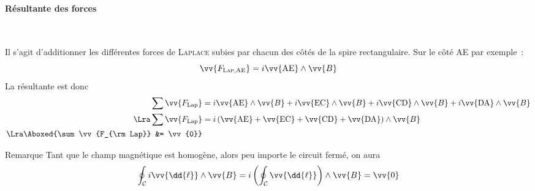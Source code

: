 \documentclass[../main/main.tex]{subfiles}
\begin{document}
\paragraph*{Résultante des forces}~
\begin{hide}
  Il s'agit d'additionner les différentes forces de \textsc{Laplace} subies par
  chacun des côtés de la spire rectangulaire. Sur le côté AE par exemple~:
  \[
  \vv{F_{\textsc{Lap}, \rm AE}} = i \vv{\rm AE}\wedge \vv{B}
  \]
  La résultante est donc
  \begin{align*}
  \sum \vv{F_{\rm Lap}} &=
    i \vv{\rm AE}\wedge \vv{B} +
    i \vv{\rm EC}\wedge \vv{B} +
    i \vv{\rm CD}\wedge \vv{B} +
    i \vv{\rm DA}\wedge \vv{B}
  \\\Lra
  \sum \vv{F_{\rm Lap}} &=
    i \left( \vv{\rm AE} + \vv{\rm EC} + \vv{\rm CD} + \vv{\rm DA} \right)\wedge
    \vv{B}
  \\\Lra 
  \Aboxed{\sum \vv{F_{\rm Lap}} &= \vv{0}}
  \end{align*}
\end{hide}

\begin{rexem}{Remarque}
  Tant que le champ magnétique est homogène, alors peu importe le circuit fermé,
  on aura
  \[
    \oint_{\mathcal{C}}^{} i \vv{\dd{\ell }}\wedge \vv{B} =
    i \left( \oint_{\mathcal{C}} \vv{\dd{\ell }} \right)\wedge \vv{B} = \vv{0}
  \]
\end{rexem}
\end{document}

